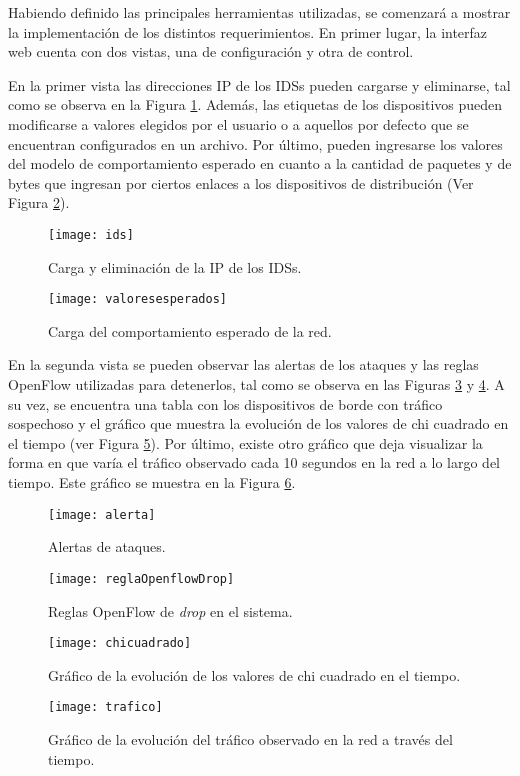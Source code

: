 Habiendo definido las principales herramientas utilizadas, se comenzará a mostrar la implementación de los distintos requerimientos. En primer lugar, la interfaz web cuenta con dos vistas, una de configuración y otra de control.

En la primer vista las direcciones IP de los IDSs pueden cargarse y eliminarse, tal como se observa en la Figura \ref{fig:post_ids}. Además, las etiquetas de los dispositivos pueden modificarse a valores elegidos por el usuario o a aquellos por defecto que se encuentran configurados en un archivo. Por último, pueden ingresarse los valores del modelo de comportamiento esperado en cuanto a la cantidad de paquetes y de bytes que ingresan por ciertos enlaces a los dispositivos de distribución (Ver Figura \ref{fig:set_comportamiento_esperado}).

\begin{figure}[H]
	\centering 
	\texttt{[image: ids]}
	\caption{Carga y eliminación de la IP de los IDSs.}
	\label{fig:post_ids}
\end{figure}

\begin{figure}[H]
	\centering 
	\texttt{[image: valoresesperados]}
	\caption{Carga del comportamiento esperado de la red.}
	\label{fig:set_comportamiento_esperado}
\end{figure}

En la segunda vista se pueden observar las alertas de los ataques y las reglas
OpenFlow utilizadas para detenerlos, tal como se observa en las Figuras
\ref{fig:alertas} y \ref{fig:reglas_drop}. A su vez, se encuentra una tabla con
los dispositivos de borde con tráfico sospechoso y el gráfico que muestra la
evolución de los valores de chi cuadrado en el tiempo (ver Figura
\ref{fig:Chi_cuadrado_graph}). Por último, existe otro gráfico que deja
visualizar la forma en que varía el tráfico observado cada 10 segundos en la red
a lo largo del tiempo. Este gráfico se muestra en la Figura
\ref{fig:trafico_obs_10}.

\begin{figure}[H]
	\centering 
	\texttt{[image: alerta]}
	\caption{Alertas de ataques.}
	\label{fig:alertas}
\end{figure}


\begin{figure}[H]
	\centering 
	\texttt{[image: reglaOpenflowDrop]}
	\caption{Reglas OpenFlow de \textit{drop} en el sistema.}
	\label{fig:reglas_drop}
\end{figure}


\begin{figure}[H]
	\centering 
	\texttt{[image: chicuadrado]}
	\caption{Gráfico de la evolución de los valores de chi cuadrado en el tiempo.}
	\label{fig:Chi_cuadrado_graph}
\end{figure}

\begin{figure}[H]
	\centering 
	\texttt{[image: trafico]}
	\caption{Gráfico de la evolución del tráfico observado en la red a través del tiempo.}
	\label{fig:trafico_obs_10}
\end{figure}


